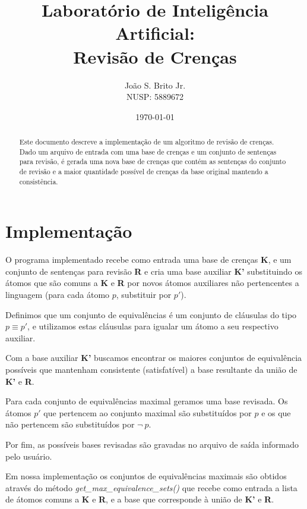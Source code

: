 \documentclass[10pt,a4paper]{amsart}
\author{Jo\~ao S. Brito Jr.\\NUSP: 5889672}
\title{Laboratório de Inteligência Artificial: \\Revisão de Crenças}
\date{\today}
\begin{document}
\begin{abstract}
  Este documento descreve a implementação de um algoritmo de revisão de crenças. Dado um arquivo de entrada com uma base de crenças e um conjunto de sentenças para revisão, é gerada uma nova base de crenças que contém as sentenças do conjunto de revisão e a maior quantidade possível de crenças da base original mantendo a consistência.
\end{abstract}

\maketitle


\section{Implementação}
O programa implementado recebe como entrada uma base de crenças \textbf{K}, e um conjunto de sentenças para revisão \textbf{R} e cria uma base auxiliar \textbf{K'} substituindo os átomos que são comuns a \textbf{K} e \textbf{R} por novos átomos auxiliares não pertencentes a linguagem (para cada átomo $p$, substituir por $p'$).

Definimos que um conjunto de equivalências é um conjunto de cláusulas do tipo $p \equiv p'$, e utilizamos estas cláusulas para igualar um átomo a seu respectivo auxiliar.

Com a base auxiliar \textbf{K'} buscamos encontrar os maiores conjuntos de equivalência possíveis que mantenham consistente (satisfatível) a base resultante da união de \textbf{K'} e \textbf{R}.

Para cada conjunto de equivalências maximal geramos uma base revisada. Os átomos $p'$ que pertencem ao conjunto maximal são substituídos por $p$ e os que não pertencem são substituídos por $\neg ~p$.

Por fim, as possíveis bases revisadas são gravadas no arquivo de saída informado pelo usuário.

Em nossa implementação os conjuntos de equivalências maximais são obtidos através do método \emph{get\_max\_equivalence\_sets()} que recebe como entrada a lista de átomos comuns a \textbf{K} e \textbf{R}, e a base que corresponde à união de \textbf{K'} e \textbf{R}.
\end{document}
